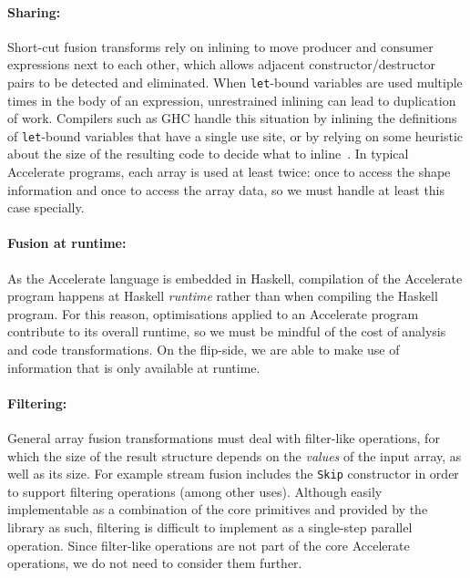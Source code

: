 \paragraph{Sharing:} Short-cut fusion transforms rely on
inlining to move producer and consumer expressions next to each other, which
allows adjacent constructor/destructor pairs to be detected and eliminated. When
\texttt{let}-bound variables are used multiple times in the body of an
expression, unrestrained inlining can lead to duplication of work. Compilers
such as GHC handle this situation by inlining the definitions of
\texttt{let}-bound variables that have a single use site, or by relying on some
heuristic about the size of the resulting code to decide what to
inline~\cite{PeytonJones:2003gb}. In typical Accelerate programs, each array is
used at least twice: once to access the shape information and once to access the
array data, so we must handle at least this case specially.

\paragraph{Fusion at runtime:} As the Accelerate language is embedded in
Haskell, compilation of the Accelerate program happens at Haskell
\emph{runtime} rather than when compiling the Haskell program. For this reason,
optimisations applied to an Accelerate program contribute to its overall
runtime, so we must be mindful of the cost of analysis and code transformations.
On the flip-side, we are able to make use of information that is only available
at runtime.

\paragraph{Filtering:} General array fusion transformations must deal with
filter-like operations, for which the size of the result structure depends on
the \emph{values} of the input array, as well as its size. For example
stream fusion includes the \texttt{Skip} constructor in
order to support filtering operations (among other uses). Although easily
implementable as a combination of the core primitives and provided by the
library as such, filtering is difficult to implement as a single-step parallel
operation. Since filter-like operations are not part of the core Accelerate
operations, we do not need to consider them further.

%

